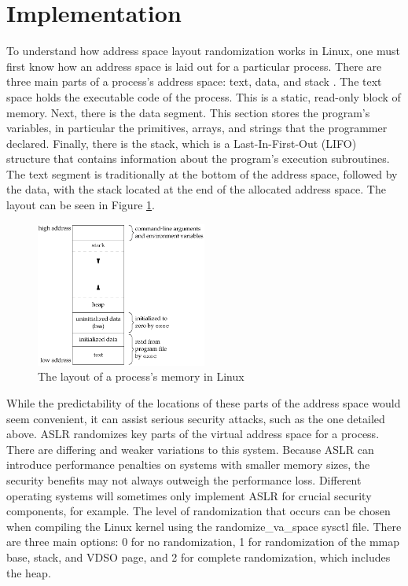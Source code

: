 \section{Implementation}
\label{s:implementation} %

To understand how address space layout randomization works in Linux, one must first know how an address space is laid out for a particular process. There are three main parts of a process’s address space: text, data, and stack \cite{memorylayout}. The text space holds the executable code of the process. This is a static, read-only block of memory. Next, there is the data segment. This section stores the program’s variables, in particular the primitives, arrays, and strings that the programmer declared. Finally, there is the stack, which is a Last-In-First-Out (LIFO) structure that contains information about the program’s execution subroutines. The text segment is traditionally at the bottom of the address space, followed by the data, with the stack located at the end of the allocated address space. The layout can be seen in Figure \ref{f:memory_layout}.

\begin{figure}
\centering %
\includegraphics[width=0.5\textwidth]{figures/Memory-Layout.png}
\caption{The layout of a process's memory in Linux \cite{memorylayout}}
\label{f:memory_layout}
\end{figure}

While the predictability of the locations of these parts of the address space would seem convenient, it can assist serious security attacks, such as the one detailed above. ASLR randomizes key parts of the virtual address space for a process. There are differing and weaker variations to this system. Because ASLR can introduce performance penalties on systems with smaller memory sizes, the security benefits may not always outweigh the performance loss. Different operating systems will sometimes only implement ASLR for crucial security components, for example. The level of randomization that occurs can be chosen when compiling the Linux kernel using the randomize\_va\_space sysctl file. There are three main options: 0 for no randomization, 1 for randomization of the mmap base, stack, and VDSO page, and 2 for complete randomization, which includes the heap. \cite{kerneldocs}


